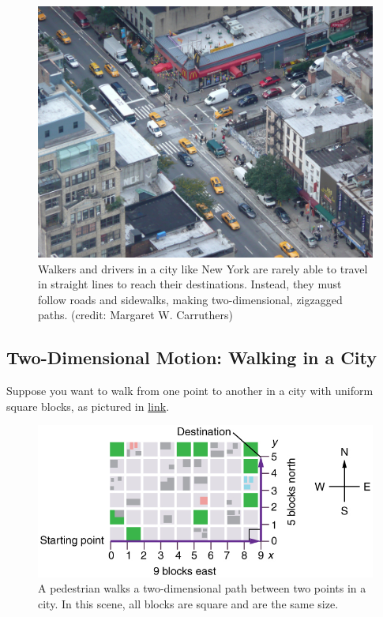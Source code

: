 \documentclass[
]{book}
\begin{document}
\begin{figure}
\hypertarget{import-auto-id1165298608692}{%
\centering
\includegraphics{images/Figure_03_01_00.jpg}
\caption{Walkers and drivers in a city like New York are rarely able to travel
in straight lines to reach their destinations. Instead, they must follow
roads and sidewalks, making two-dimensional, zigzagged paths. (credit:
Margaret W.
Carruthers)}\label{import-auto-id1165298608692}
}
\end{figure}

\hypertarget{fs-id1165298595412}{}
\hypertarget{two-dimensional-motion-walking-in-a-city}{%
\subsection{Two-Dimensional Motion: Walking in a City}\label{two-dimensional-motion-walking-in-a-city}}

Suppose you want to walk from one point to another in a city with
uniform square blocks, as pictured in
\protect\hyperlink{import-auto-id1165296250183}{link}.

\begin{figure}
\hypertarget{import-auto-id1165296250183}{%
\centering
\includegraphics{images/Figure_03_01_01.jpg}
\caption{A pedestrian walks a two-dimensional path between two points in a
city. In this scene, all blocks are square and are the same
size.}\label{import-auto-id1165296250183}
}
\end{figure}
\end{document}
